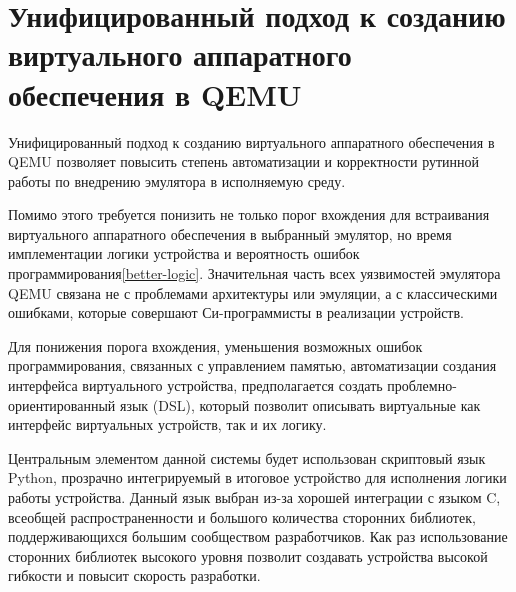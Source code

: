 \section{Унифицированный подход к созданию виртуального аппаратного обеспечения в QEMU}\label{sec:ch1/sec4}

Унифицированный подход к созданию виртуального аппаратного обеспечения в QEMU позволяет
повысить степень автоматизации и корректности рутинной работы по внедрению
эмулятора в исполняемую среду.

Помимо этого требуется понизить не только порог вхождения для встраивания виртуального аппаратного обеспечения
в выбранный эмулятор, но время имплементации логики устройства и вероятность ошибок программирования\cref{better-logic}.
Значительная часть всех уязвимостей эмулятора QEMU связана не с проблемами архитектуры или эмуляции,
а с классическими ошибками, которые совершают Си-программисты в реализации устройств.


Для понижения порога вхождения, уменьшения возможных ошибок программирования,
связанных с управлением памятью, автоматизации создания интерфейса виртуального
устройства, предполагается создать проблемно-ориентированный язык (DSL), который позволит
описывать виртуальные как интерфейс виртуальных устройств, так и их логику.

Центральным элементом данной системы будет использован скриптовый язык Python, прозрачно интегрируемый
в итоговое устройство для исполнения логики работы устройства.
Данный язык выбран из-за хорошей интеграции с языком C, всеобщей распространенности и большого
количества сторонних библиотек, поддерживающихся большим сообществом разработчиков.
Как раз использование сторонних библиотек высокого уровня позволит создавать устройства
высокой гибкости и повысит скорость разработки.


